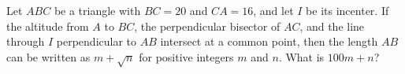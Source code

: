 Let $ABC$ be a triangle with $BC=20$ and $CA=16$, and let $I$ be its incenter. If the altitude from $A$ to $BC$, the perpendicular bisector of $AC$, and the line through $I$ perpendicular to $AB$ intersect at a common point, then the length $AB$ can be written as $m+\sqrt{n}$ for positive integers $m$ and $n$. What is $100m+n$?

